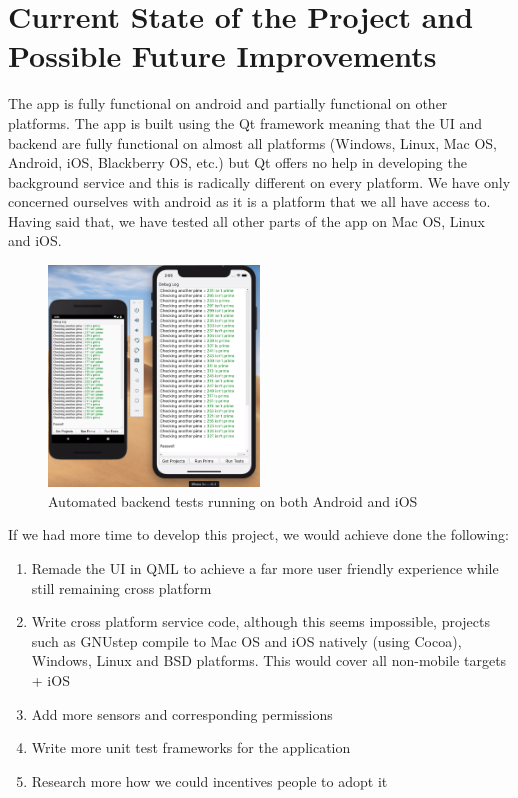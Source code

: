 \documentclass{article}
\begin{document}
\section{Current State of the Project and Possible Future Improvements}
The app is fully functional on android and partially functional on other platforms. The app is built using the Qt framework meaning that
the UI and backend are fully functional on almost all platforms (Windows, Linux, Mac OS, Android, iOS, Blackberry OS, etc.) but
Qt offers no help in developing the background service and this is radically different on every platform. We have only concerned ourselves
with android as it is a platform that we all have access to. Having said that, we have tested all other parts of the app on
Mac OS, Linux and iOS.
\begin{figure}[h]
  \centering
  \includegraphics[width=0.5\textwidth]{DocFiles/tests}
  \caption{Automated backend tests running on both Android and iOS}
\end{figure}
If we had more time to develop this project, we would achieve done the following:
\begin{enumerate}
  \item{Remade the UI in QML to achieve a far more user friendly experience while still remaining cross platform}
  \item{Write cross platform service code, although this seems impossible, projects such as GNUstep compile to Mac OS and iOS natively (using Cocoa),
    Windows, Linux and BSD platforms. This would cover all non-mobile targets + iOS}
  \item{Add more sensors and corresponding permissions}
  \item{Write more unit test frameworks for the application}
  \item{Research more how we could incentives people to adopt it}
\end{enumerate}
\end{document}

